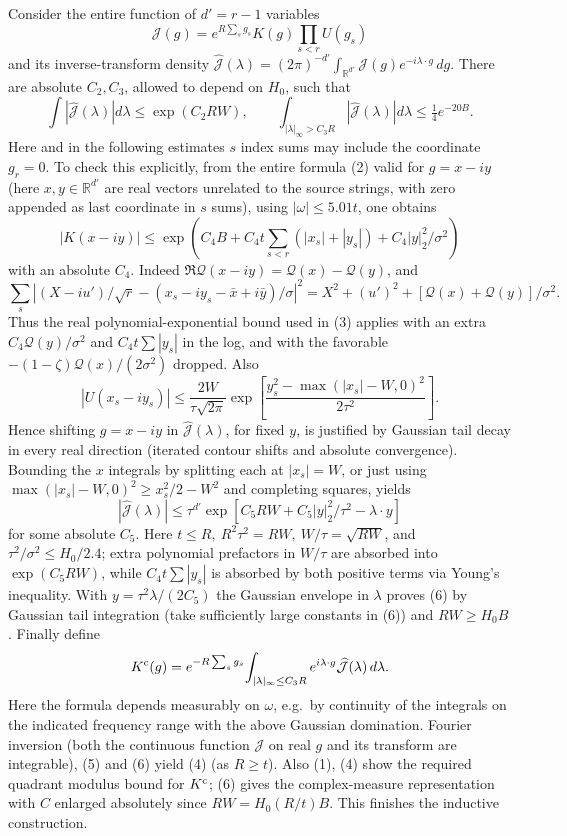 \documentclass[11pt]{article}
\begin{document}
Consider the entire function of \(d'=r-1\) variables
\[
 \mathcal J(g)=e^{R\sum_s g_s} K(g)\prod_{s<r}U(g_s)
\]
and its inverse-transform density \(\widehat{\mathcal J}(\lambda)=(2\pi)^{-d'}\int_{\mathbb R^{d'}} \mathcal J(g)e^{-i\lambda\cdot g}\,d g\). There are absolute \(C_2,C_3\), allowed to depend on \(H_0\), such that
\[
 \int|\widehat{\mathcal J}(\lambda)|d\lambda\le \exp(C_2 RW),\qquad
 \int_{|\lambda|_\infty>C_3 R}|\widehat{\mathcal J}(\lambda)|d\lambda \le \tfrac14 e^{-20 B}.
 \tag{6}
\]
Here and in the following estimates \(s\) index sums may include the coordinate \(g_r=0\). To check this explicitly, from the entire formula (2) valid for \(g=x-i y\) (here \(x,y\in\mathbb R^{d'}\) are real vectors unrelated to the source strings, with zero appended as last coordinate in \(s\) sums), using \(|\omega|\le5.01t\), one obtains
\[
 |K(x-i y)|\le \exp(C_4 B+C_4 t\textstyle\sum_{s<r}(|x_s|+|y_s|)+C_4|y|_2^2/\sigma^2)
\]
with an absolute \(C_4\). Indeed \(\Re \mathcal{Q}(x-i y)=\mathcal{Q}(x)-\mathcal{Q}(y)\), and
\[
 \sum_s |(X-i u')/\sqrt r-(x_s-i y_s-\bar x+i\bar y)/\sigma|^2
 = X^2+(u')^2 + [\mathcal{Q}(x)+\mathcal{Q}(y)]/\sigma^2 .
\]
Thus the real polynomial-exponential bound used in (3) applies with an extra \(C_4 \mathcal{Q}(y)/\sigma^2\) and \(C_4 t\sum|y_s|\) in the log, and with the favorable \(-(1-\zeta)\mathcal{Q}(x)/(2\sigma^2)\) dropped. Also
\[
 |U(x_s-i y_s)|\le
 \frac{2W}{\tau\sqrt{2\pi}}\exp\!\left[\frac{y_s^2-\max(|x_s|-W,0)^2}{2\tau^2}\right].
\]
Hence shifting \(g=x-i y\) in \(\widehat{\mathcal J}(\lambda)\), for fixed \(y\), is justified by Gaussian tail decay in every real direction (iterated contour shifts and absolute convergence). Bounding the \(x\) integrals by splitting each at \(|x_s|=W\), or just using \(\max(|x_s|-W,0)^2\ge x_s^2/2 - W^2\) and completing squares, yields
\[
 |\widehat{\mathcal J}(\lambda)|\le \tau^{d'}\exp[C_5 RW + C_5 |y|_2^2/\tau^2-\lambda\cdot y]
\]
for some absolute \(C_5\). Here \(t\le R,\ R^2\tau^2=RW,\ W/\tau=\sqrt{RW}\), and \(\tau^2/\sigma^2\le H_0/2.4\); extra polynomial prefactors in \(W/\tau\) are absorbed into \(\exp(C_5 RW)\), while \(C_4 t\sum|y_s|\) is absorbed by both positive terms via Young's inequality. With \(y=\tau^2\lambda/(2C_5)\) the Gaussian envelope in \(\lambda\) proves (6) by Gaussian tail integration (take sufficiently large constants in (6)) and \(RW\ge H_0 B\). Finally define
\[
 K^{\rm c}(g)= e^{-R\sum_sg_s}\!\int_{|\lambda|_\infty\le C_3 R} e^{i\lambda\cdot g}\widehat{\mathcal J}(\lambda)\,d\lambda .
\]
Here the formula depends measurably on \(\omega\), e.g.\ by continuity of the integrals on the indicated frequency range with the above Gaussian domination. Fourier inversion (both the continuous function \(\mathcal J\) on real \(g\) and its transform are integrable), (5) and (6) yield (4) (as \(R\ge t\)). Also (1), (4) show the required quadrant modulus bound for \(K^{\rm c}\); (6) gives the complex-measure representation with \(C\) enlarged absolutely since \(RW=H_0(R/t)B\). This finishes the inductive construction.
\end{document}
